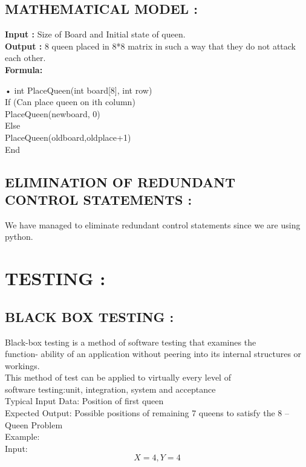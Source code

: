 \documentclass{article}
\begin{document}
	
	\subsection{MATHEMATICAL MODEL : }
	\begin{flushleft}
		\textbf{Input : }  Size of Board and Initial state of queen.\\
		\textbf{Output : } 8 queen placed in 8*8 matrix in such a way that they do not attack each other.\\
		\textbf{Formula:}
	\end{flushleft}•
	int PlaceQueen(int board[8], int row)  \\
	If (Can place queen on ith column)  \\
	PlaceQueen(newboard, 0)\\
	Else  \\
	PlaceQueen(oldboard,oldplace+1) \\
	End
	\subsection{ELIMINATION OF REDUNDANT CONTROL STATEMENTS : } We have managed to eliminate redundant control statements since we are using python.
	
	\section{TESTING :}
	
	\subsection{BLACK BOX TESTING : }
	Black-box testing is a method of software testing that examines the\\ function- ability of an application without peering into its internal structures or workings.\\
	This method of test can be applied to virtually every level of\\ software testing:unit, integration, system and acceptance\\
	Typical Input Data:  Position of first queen\\
	Expected Output: Possible positions of remaining 7 queens to satisfy the 8 – Queen Problem\\
	
	\noindent Example:\\
	Input: \\
	$$X = 4 , Y = 4$$
	
\end{document}
